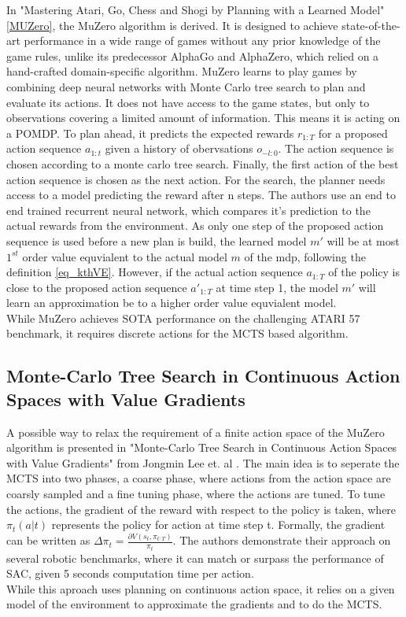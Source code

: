 In "Mastering Atari, Go, Chess and Shogi by Planning with a
Learned Model" \ref{MUZero}, the MuZero algorithm is derived. It is designed to achieve state-of-the-art performance 
in a wide range of games without any prior knowledge of the game rules, unlike its predecessor AlphaGo and AlphaZero, which relied on a hand-crafted 
domain-specific algorithm. MuZero learns to play games by combining deep neural networks with Monte Carlo tree search to plan and evaluate its actions. 
It does not have access to the game states, but only to observations covering a limited amount of information. This means it is acting on a POMDP.
To plan ahead, it predicts the expected rewards $r_{1:T}$ for a proposed action sequence $a_{1:t}$ given a history of obervsations $o_{-l:0}$. The action 
sequence is chosen according to a monte carlo tree search. Finally, the first action of the best action sequence is chosen as the next action. 
For the search, the planner needs access to a model predicting the reward after n steps. The authors use an end to end trained recurrent neural network, which 
compares it's prediction to the actual rewards from the environment. As only one step of the proposed action sequence is used before a new plan is build, the 
learned model $m'$ will be at most $1^{st}$ order value equvialent to the actual model $m$ of the mdp, following the definition \ref{eq_kthVE}. However, if 
the actual action sequence $a_{1:T}$ of the policy is close to the proposed action sequence $a'_{1:T}$ at time step 1, the model $m'$ will learn an approximation 
be to a higher order value equvialent model.\\ 
While MuZero achieves SOTA performance on the challenging ATARI 57 benchmark, it requires discrete actions for the MCTS based algorithm.

\subsection{Monte-Carlo Tree Search in Continuous Action Spaces with Value Gradients}
\label{sec:mctsca}
A possible way to relax the requirement of a finite action space of the MuZero algorithm is presented in 
"Monte-Carlo Tree Search in Continuous Action Spaces with Value Gradients" from Jongmin Lee et. al \cite{Lee_Jeon_Kim_Kim_2020}. The main idea is to seperate 
the MCTS into two phases, a coarse phase, where actions from the action space are coarsly sampled and a fine tuning phase, where the actions are tuned. 
To tune the actions, the gradient of the reward with respect to the policy is taken, where $\pi_t(a|t)$ represents the policy for action at time step t. 
Formally, the gradient can be written as $\Delta \pi_t = \frac{\partial V (s_t, \pi_{t:T})}{\pi_{t}}$. The authors demonstrate their approach on several robotic 
benchmarks, where it can match or surpass the performance of SAC, given 5 seconds computation time per action.\\
While this aproach uses planning on continuous action space, it relies on a given model of the environment to approximate the gradients and to do the MCTS.